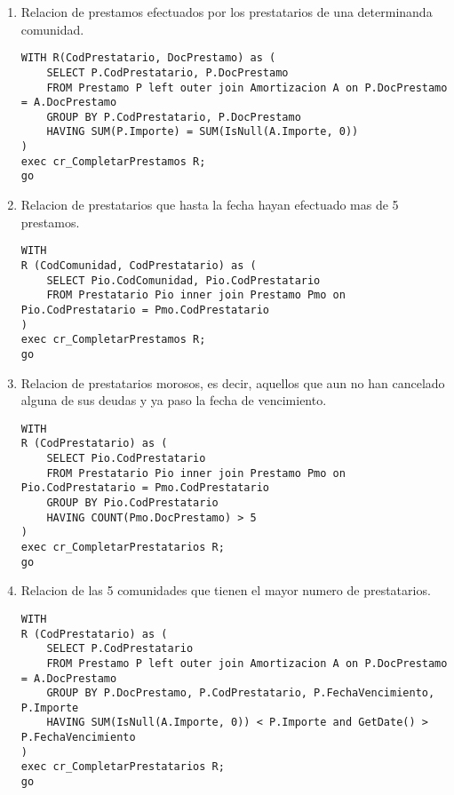 \begin{enumerate}
\item Relacion de prestamos efectuados por los prestatarios de una
determinanda comunidad.

\begin{verbatim}
WITH R(CodPrestatario, DocPrestamo) as (
    SELECT P.CodPrestatario, P.DocPrestamo
    FROM Prestamo P left outer join Amortizacion A on P.DocPrestamo = A.DocPrestamo
    GROUP BY P.CodPrestatario, P.DocPrestamo
    HAVING SUM(P.Importe) = SUM(IsNull(A.Importe, 0))
)
exec cr_CompletarPrestamos R;
go
\end{verbatim}

\skiplines{}
\item Relacion de prestatarios que hasta la fecha hayan efectuado mas de 5
prestamos.

\begin{verbatim}
WITH
R (CodComunidad, CodPrestatario) as (
    SELECT Pio.CodComunidad, Pio.CodPrestatario
    FROM Prestatario Pio inner join Prestamo Pmo on Pio.CodPrestatario = Pmo.CodPrestatario
)
exec cr_CompletarPrestamos R;
go
\end{verbatim}

\skiplines{}
\item Relacion de prestatarios morosos, es decir, aquellos que aun no han
cancelado alguna de sus deudas y ya paso la fecha de vencimiento.

\begin{verbatim}
WITH
R (CodPrestatario) as (
    SELECT Pio.CodPrestatario
    FROM Prestatario Pio inner join Prestamo Pmo on Pio.CodPrestatario = Pmo.CodPrestatario
    GROUP BY Pio.CodPrestatario
    HAVING COUNT(Pmo.DocPrestamo) > 5
)
exec cr_CompletarPrestatarios R;
go
\end{verbatim}

\skiplines{}
\item Relacion de las 5 comunidades que tienen el mayor numero de
prestatarios.

\begin{verbatim}
WITH
R (CodPrestatario) as (
    SELECT P.CodPrestatario
    FROM Prestamo P left outer join Amortizacion A on P.DocPrestamo = A.DocPrestamo
    GROUP BY P.DocPrestamo, P.CodPrestatario, P.FechaVencimiento, P.Importe
    HAVING SUM(IsNull(A.Importe, 0)) < P.Importe and GetDate() > P.FechaVencimiento
)
exec cr_CompletarPrestatarios R;
go
\end{verbatim}


\end{enumerate}
